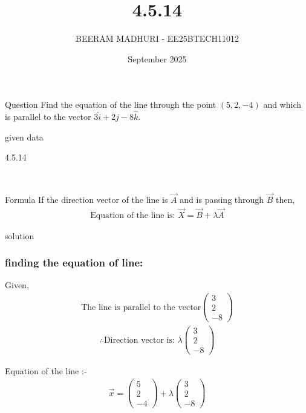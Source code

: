 \documentclass{beamer}
\title %
{4.5.14}
\date{September  2025}
\author %
{BEERAM MADHURI - EE25BTECH11012}
\begin{document}
\frame{\titlepage}
\begin{frame}{Question}
 Find the equation of the line through the point $(5, 2, -4)$ and which is parallel to the vector $3\hat{i} + 2\hat{j} - 8\hat{k}$.
\end{frame}
 
\begin{frame}{given data}
 
\begin{table}[h!]
    \centering
    
    \caption{4.5.14}
    \label{table 4.5.14}
\end{table}\\
   
\end{frame}

\begin{frame}{Formula}
If the direction vector of the line is $\vec{A}$ and is passing through $\vec{B}$ then, 
\begin{align*}
\text{Equation of the line is: }\vec{X} = \vec{B} +\lambda\vec{A}
 \end{align*}
 \end{frame}
\begin{frame}{solution}
    \frametitle{finding the equation of line: }
Given,
\begin{align}
\text{The line is parallel to the vector}
\begin{pmatrix}3 \\2 \\-8\end{pmatrix}
\end{align}
\begin{align}
\therefore \text{Direction vector is: } \lambda\begin{pmatrix}
3 \\
2 \\
-8
\end{pmatrix}
\end{align}

Equation of the line :-
\begin{align}
\vec{x} = \begin{pmatrix}5 \\2 \\-4\end{pmatrix} + \lambda \begin{pmatrix}3 \\2 \\-8\end{pmatrix}
\end{align}
\end{frame}
\end{document}
